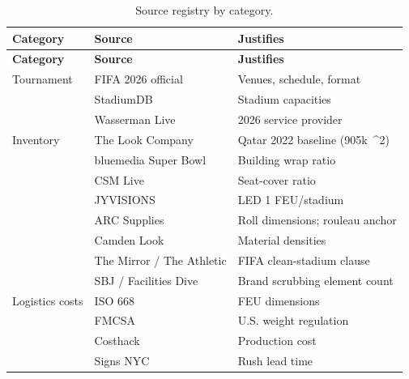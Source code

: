 \documentclass[11pt,a4paper]{article}
\numberwithin{equation}{section}
\newcommand{\msq}{\text{m}^{2}}
\begin{document}
\begin{longtable}{@{}p{} p{} p{}@{}}
\caption{Source registry by category.\label{tab:sources-cat}}\\
\toprule
\textbf{Category} & \textbf{Source} & \textbf{Justifies}\\
\midrule
\endfirsthead
\toprule
\textbf{Category} & \textbf{Source} & \textbf{Justifies}\\
\midrule
\endhead
\bottomrule
\endlastfoot
Tournament       & FIFA 2026 official \cite{fifa2026official}            & Venues, schedule, format \\
                 & StadiumDB \cite{stadiumdb_wc2026}                      & Stadium capacities \\
                 & Wasserman Live \cite{wassermanlive_wc2026}             & 2026 service provider \\
Inventory        & The Look Company \cite{thelookcompany_qatar}           & Qatar 2022 baseline (905k~\msq) \\
                 & bluemedia Super Bowl \cite{bluemedia_superbowl}        & Building wrap ratio \\
                 & CSM Live \cite{csmlive_dressing}                       & Seat-cover ratio \\
                 & JYVISIONS \cite{jyvisions_led}                          & LED 1 FEU/stadium \\
                 & ARC Supplies \cite{arcsupplies_rolls}                  & Roll dimensions; rouleau anchor \\
                 & Camden Look \cite{camden_lookspec}                     & Material densities \\
                 & The Mirror / The Athletic \cite{themirror_scrubbing}   & FIFA clean-stadium clause \\
                 & SBJ / Facilities Dive \cite{sbj_facilitiesdive}        & Brand scrubbing element count \\
Logistics costs  & ISO 668 \cite{iso_container}                            & FEU dimensions \\
                 & FMCSA \cite{fmcsa_weight}                              & U.S. weight regulation \\
                 & Costhack \cite{costhack_printing}                       & Production cost \\
                 & Signs NYC \cite{signsnyc_rush}                          & Rush lead time \\

\end{longtable}
\end{document}
